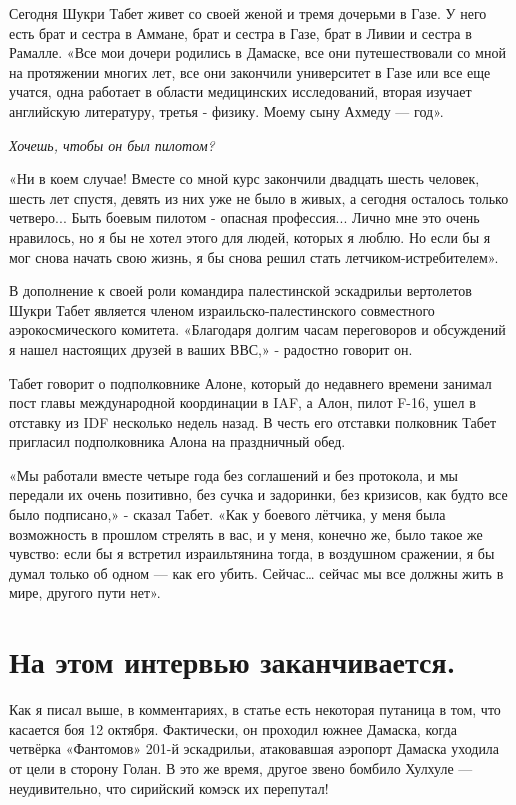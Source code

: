 Сегодня Шукри Табет живет со своей женой и тремя дочерьми в Газе. У него есть брат и сестра в Аммане, брат и сестра в Газе, брат в Ливии и сестра в Рамалле. «Все мои дочери родились в Дамаске, все они путешествовали со мной на протяжении многих лет, все они закончили университет в Газе или все еще учатся, одна работает в области медицинских исследований, вторая изучает английскую литературу, третья - физику. Моему сыну Ахмеду — год».

\textit{Хочешь, чтобы он был пилотом?}

«Ни в коем случае! Вместе со мной курс закончили двадцать шесть человек, шесть лет спустя, девять из них уже не было в живых, а сегодня осталось только четверо... Быть боевым пилотом - опасная профессия... Лично мне это очень нравилось, но я бы не хотел этого для людей, которых я люблю. Но если бы я мог снова начать свою жизнь, я бы снова решил стать летчиком-истребителем».

В дополнение к своей роли командира палестинской эскадрильи вертолетов Шукри Табет является членом израильско-палестинского совместного аэрокосмического комитета. «Благодаря долгим часам переговоров и обсуждений я нашел настоящих друзей в ваших ВВС,» - радостно говорит он.

Табет говорит о подполковнике Алоне, который до недавнего времени занимал пост главы международной координации в IAF, а Алон, пилот F-16, ушел в отставку из IDF несколько недель назад. В честь его отставки полковник Табет пригласил подполковника Алона на праздничный обед.

‌«Мы работали вместе четыре года без соглашений и без протокола, и мы передали их очень позитивно, без сучка и задоринки, без кризисов, как будто все было подписано,» - сказал Табет. «Как у боевого лётчика, у меня была возможность в прошлом стрелять в вас, и у меня, конечно же, было такое же чувство: если бы я встретил израильтянина тогда, в воздушном сражении, я бы думал только об одном — как его убить. Сейчас… сейчас мы все должны жить в мире, другого пути нет». 

\section{На этом интервью заканчивается.}

Как я писал выше, в комментариях, в статье есть некоторая путаница в том, что касается боя 12 октября. Фактически, он проходил южнее Дамаска, когда четвёрка «Фантомов» 201-й эскадрильи, атаковавшая аэропорт Дамаска уходила от цели в сторону Голан. В это же время, другое звено бомбило Хулхуле — неудивительно, что сирийский комэск их перепутал!

